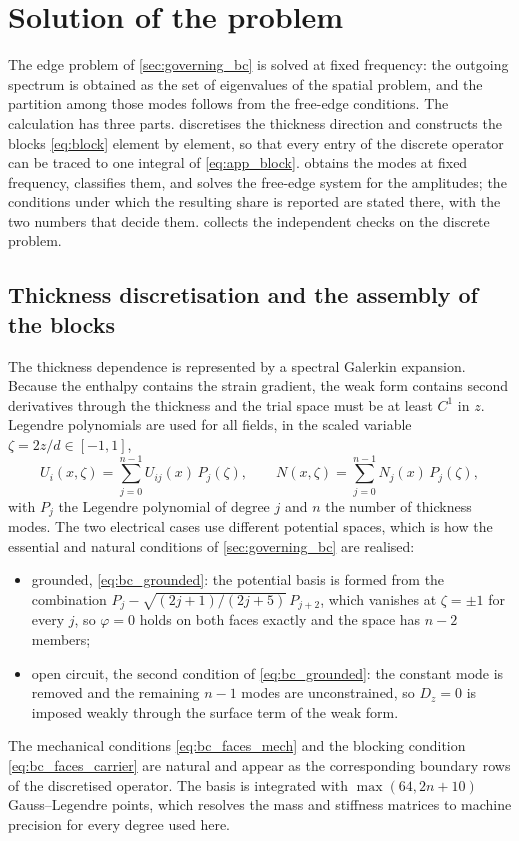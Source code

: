\section{Solution of the problem}
\label{sec:numerics}

The edge problem of \cref{sec:governing_bc} is solved at fixed frequency: the
outgoing spectrum is obtained as the set of eigenvalues of the spatial problem,
and the partition among those modes follows from the free-edge conditions.  The
calculation has three parts.   discretises the thickness
direction and constructs the blocks \eqref{eq:block} element by element, so that
every entry of the discrete operator can be traced to one integral of
\eqref{eq:app_block}.   obtains the modes at fixed
frequency, classifies them, and solves the free-edge system for the amplitudes;
the conditions under which the resulting share is reported are stated there, with
the two numbers that decide them.   collects the
independent checks on the discrete problem.

\subsection{Thickness discretisation and the assembly of the blocks}
\label{sec:numerics_basis}

The thickness dependence is represented by a spectral Galerkin expansion.
Because the enthalpy contains the strain gradient, the weak form contains second
derivatives through the thickness and the trial space must be at least $C^1$ in
$z$.  Legendre polynomials are used for all fields, in the scaled variable
$\zeta=2z/d\in[-1,1]$,
\begin{equation}
\label{eq:basis}
U_i(x,\zeta)=\sum_{j=0}^{n-1}U_{ij}(x)\,P_j(\zeta),\qquad
N(x,\zeta)=\sum_{j=0}^{n-1}N_{j}(x)\,P_j(\zeta),
\end{equation}
with $P_j$ the Legendre polynomial of degree $j$ and $n$ the number of
thickness modes.  The two electrical cases use different potential spaces,
which is how the essential and natural conditions of
\cref{sec:governing_bc} are realised:
\begin{itemize}
\item grounded, \eqref{eq:bc_grounded}: the potential basis is formed from the
combination $P_j-\sqrt{(2j+1)/(2j+5)}\,P_{j+2}$, which vanishes at
$\zeta=\pm1$ for every $j$, so $\varphi=0$ holds on both faces exactly and the
space has $n-2$ members;
\item open circuit, the second condition of \eqref{eq:bc_grounded}: the constant
mode is removed and the
remaining $n-1$ modes are unconstrained, so $D_z=0$ is imposed weakly through
the surface term of the weak form.
\end{itemize}
The mechanical conditions \eqref{eq:bc_faces_mech} and the blocking condition
\eqref{eq:bc_faces_carrier} are natural and appear as the corresponding boundary
rows of the discretised operator.  The basis is integrated with
$\max(64,2n+10)$ Gauss--Legendre points, which resolves the mass and stiffness
matrices to machine precision for every degree used here.

